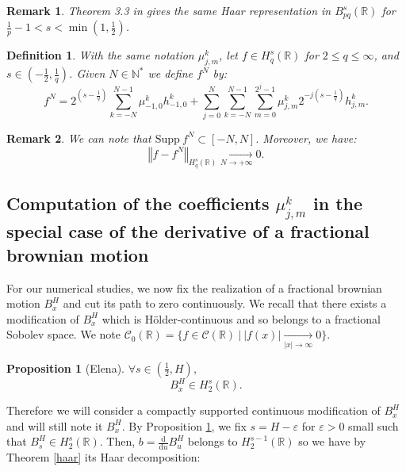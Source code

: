 \documentclass[11pt]{article}
\newcommand{\de}[2]{\frac{\mathrm{d} #1}{\mathrm{d} #2}}
\newtheorem{defi}{Definition}
\newtheorem{Pro}{Proposition}
\newtheorem{rem}{Remark}
\newcommand{\norme}[1]{\left\Vert #1\right\Vert}
\newcommand{\R}{\mathbb{R}}
\newcommand{\N}{\mathbb{N}}
\begin{document}
\begin{rem}\label{besov}
    Theorem 3.3 in \cite{Tri-fab} gives the same Haar representation in $B^s_{pq}(\R)$ for $\frac{1}{p}-1<s<\min\left(1,\frac{1}{2}\right)$.
\end{rem}

\begin{defi}
    With the same notation $\mu_{j,m}^k $, let $f\in H^s_q(\R)$ for $2\leq q \leq \infty$, and $s\in\left(-\frac{1}{2},\frac{1}{q}\right)$. Given $N\in\N^*$ we define $f^N$ by:
    \begin{equation}
    f^N = 2^{\left(s-\frac{1}{q}\right)}\sum_{k=-N}^{N-1}\mu_{-1,0}^kh_{-1,0}^k+\sum_{j=0}^{N}\sum_{k=-N}^{N-1}\sum_{m=0}^{2^j-1}\mu_{j,m}^k2^{-j\left(s-\frac{1}{q}\right)}h_{j,m}^k.
    \end{equation}
\end{defi}

\begin{rem}
    We can note that $\mathrm{Supp}\ f^N\subset [-N,N].$ Moreover, we have: $$\norme{f-f^N}_{H_q^s(\R)} \underset{N\rightarrow+\infty}{\longrightarrow} 0.$$
\end{rem}

\subsection{Computation of the coefficients $\mu_{j,m}^k$ in the special case of the derivative of a fractional brownian motion}

For our numerical studies, we now fix the realization of a fractional brownian motion $B^H_x$ and cut its path to zero continuously. We recall that there exists a modification of $B^H_x$ which is Hölder-continuous and so belongs to a fractional Sobolev space. We note $\mathcal{C}_0(\R)=\{f\in\mathcal{C}(\R)\ |\ |f(x)| \underset{|x|\rightarrow \infty}{\longrightarrow} 0\}$. 

\begin{Pro}[Elena]\label{elena}
    $\forall s\in\left(\frac{1}{2},H\right),$
    \begin{equation}
    B^H_x\in H^s_2(\R).
    \end{equation}
\end{Pro}

Therefore we will consider a compactly supported continuous modification of $B^H_x$ and will still note it $B^H_x$. By Proposition \ref{elena}, we fix $s=H-\varepsilon$ for $\varepsilon>0$ small such that $B^H_s\in H^s_2(\R)$. Then, $b=\de{}{u} B^H_u$ belongs to $H^{s-1}_2(\R)$ so we have by Theorem \ref{haar} its Haar decomposition:
\end{document}
